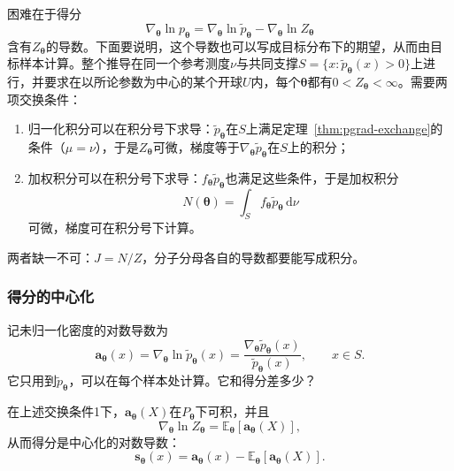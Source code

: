 困难在于得分
\[
  \nabla_{\bm{\theta}}\ln p_{\bm{\theta}}=\nabla_{\bm{\theta}}\ln\widetilde{p}_{\bm{\theta}}-\nabla_{\bm{\theta}}\ln Z_{\bm{\theta}}
\]
含有$Z_{\bm{\theta}}$的导数。下面要说明，这个导数也可以写成目标分布下的期望，从而由目标样本计算。整个推导在同一个参考测度$\nu$与共同支撑$S=\{x:\widetilde{p}_{\bm{\theta}}(x)>0\}$上进行，并要求在以所论参数为中心的某个开球$U$内，每个$\bm{\theta}$都有$0<Z_{\bm{\theta}}<\infty$。需要两项交换条件：
\begin{enumerate}
  \item 归一化积分可以在积分号下求导：$\widetilde{p}_{\bm{\theta}}$在$S$上满足定理~\ref{thm:pgrad-exchange}的条件（$\mu=\nu$），于是$Z_{\bm{\theta}}$可微，梯度等于$\nabla_{\bm{\theta}}\widetilde{p}_{\bm{\theta}}$在$S$上的积分；
  \item 加权积分可以在积分号下求导：$f_{\bm{\theta}}\widetilde{p}_{\bm{\theta}}$也满足这些条件，于是加权积分
  \[
    N(\bm{\theta})=\int_{S}f_{\bm{\theta}}\widetilde{p}_{\bm{\theta}}\,\mathrm{d}\nu
  \]
  可微，梯度可在积分号下计算。
\end{enumerate}
两者缺一不可：$J=N/Z$，分子分母各自的导数都要能写成积分。

\subsubsection{得分的中心化}
\label{sec:pgrad-centering}

记未归一化密度的对数导数为
\[
  \bm{a}_{\bm{\theta}}(x)=\nabla_{\bm{\theta}}\ln\widetilde{p}_{\bm{\theta}}(x)=\frac{\nabla_{\bm{\theta}}\widetilde{p}_{\bm{\theta}}(x)}{\widetilde{p}_{\bm{\theta}}(x)},\qquad x\in S .
\]
它只用到$\widetilde{p}_{\bm{\theta}}$，可以在每个样本处计算。它和得分差多少？

\begin{lemma}[归一化常数的对数导数]
\label{lem:pgrad-logz}
在上述交换条件1下，$\bm{a}_{\bm{\theta}}(X)$在$P_{\bm{\theta}}$下可积，并且
\begin{equation}
  \nabla_{\bm{\theta}}\ln Z_{\bm{\theta}}=\mathbb{E}_{\bm{\theta}}[\bm{a}_{\bm{\theta}}(X)],
  \label{eq:pgrad-logz}
\end{equation}
从而得分是中心化的对数导数：
\begin{equation}
  \bm{s}_{\bm{\theta}}(x)=\bm{a}_{\bm{\theta}}(x)-\mathbb{E}_{\bm{\theta}}[\bm{a}_{\bm{\theta}}(X)].
  \label{eq:pgrad-centered-score}
\end{equation}
\end{lemma}


